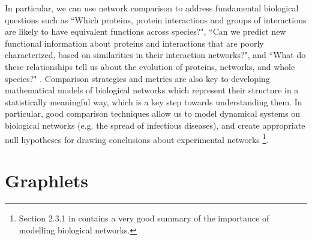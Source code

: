 \documentclass[12pt]{thesis}
\theoremstyle{plain}
\theoremstyle{definition}
\theoremstyle{remark}
\begin{document}
In particular, we can use network comparison to address fundamental biological questions such as ``Which proteins, protein interactions and groups of interactions are likely to have equivalent functions across species?", ``Can we predict new functional information about proteins and interactions that are poorly characterized, based on similarities in their interaction networks?", and ``What do these relationships tell us about the evolution of proteins, networks, and whole species?" \cite{Sharan_2006}. Comparison strategies and metrics are also key to developing mathematical models of biological networks which represent their structure in a statistically meaningful way, which is a key step towards understanding them. In particular, good comparison techniques allow us to model dynamical systems on biological networks \cite{Watts_1998} (e.g. the spread of infectious diseases), and create appropriate null hypotheses for drawing conclusions about experimental networks \cite{Hayes_2013}\footnote{Section 2.3.1 in \cite{Hayes_2013} contains a very good summary of the importance of modelling biological networks.}.


\section{Graphlets}
\end{document}

